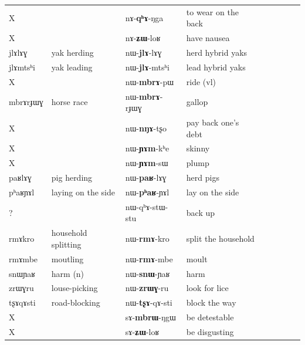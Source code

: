 \documentclass[oldfontcommands,oneside,a4paper,11pt]{article}
\newcommand{\ipa}[1]{{\phon #1}} %
\begin{document}
\begin{table}[H]
\begin{tabular}{lllllllll}
X && \ipa{nɤ-\textbf{qʰɤ}-ŋga} & to wear on the back  \\
X && \ipa{nɤ-\textbf{ʑɯ}-loʁ} & have nausea  \\
   
   
  \ipa{jlɤlɤɣ} & yak herding & \ipa{nɯ-\textbf{jlɤ}-lɤɣ} & herd hybrid yaks   \\
  \ipa{jlɤmtsʰi} & yak leading & \ipa{nɯ-\textbf{jlɤ}-mtsʰi} & lead hybrid yaks  \\
 X & & \ipa{nɯ-\textbf{mbrɤ}-pɯ} & ride (vl)  \\  
  \ipa{mbrɤrɟɯɣ} & horse race & \ipa{nɯ-\textbf{mbrɤ}-rɟɯɣ} & gallop  \\
  X &  & \ipa{nɯ-\textbf{nŋɤ}-tʂo} & pay back one's debt  \\   
       
X &   & \ipa{nɯ-\textbf{ɲɤm}-kʰe} & skinny    \\ 
X &   & \ipa{nɯ-\textbf{ɲɤm}-sɯ} & plump    \\ 
      
        \ipa{paʁlɤɣ} & pig herding & \ipa{nɯ-\textbf{paʁ}-lɤɣ} & herd pigs    \\ 
    \ipa{pʰaʁɲɤl} &  laying on the side  & \ipa{nɯ-\textbf{pʰaʁ}-ɲɤl} & lay on the side    \\ 
? & & \ipa{nɯ-qʰɤ-stɯ-stu} & back up    \\       
           \ipa{rmɤkro} & household splitting & \ipa{nɯ-\textbf{rmɤ}-kro} & split the household   \\ 
                  \ipa{rmɤmbe} & moutling & \ipa{nɯ-\textbf{rmɤ}-mbe} & moult  \\                            
        \ipa{snɯɲaʁ} & harm (n) & \ipa{nɯ-\textbf{snɯ}-ɲaʁ} &   harm \\                   
   \ipa{zrɯɣru} &louse-picking & \ipa{nɯ-\textbf{zrɯɣ}-ru} &   look for lice \\                           
     \ipa{tʂɤqɤsti} &road-blocking & \ipa{nɯ-\textbf{tʂɤ}-qɤ-sti} &   block the way  \\                           
X &  & \ipa{sɤ-\textbf{mbrɯ}-ŋgɯ} &   be detestable \\                           
X &   & \ipa{sɤ-\textbf{ʑɯ}-loʁ} & be disgusting \\
\bottomrule
 \end{tabular} 
\end{table} 
\end{document}
